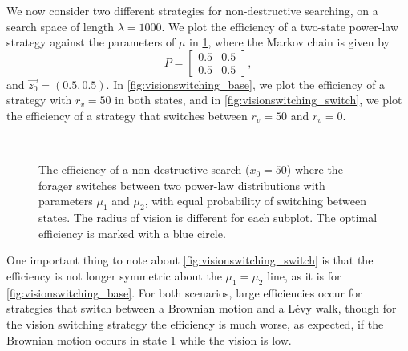 We now consider two different strategies for non-destructive searching, on a search space of length $\lambda=1000$. We plot the efficiency of a two-state power-law strategy against the parameters of $\mu$ in \cref{fig:visionswitching}, where the Markov chain is given by
\begin{equation*}
P = \begin{bmatrix}
0.5 & 0.5\\
0.5 & 0.5
\end{bmatrix},
\end{equation*} and $\vec{z_{0}} = (0.5,0.5)$. In \cref{fig:visionswitching_base}, we plot the efficiency of a strategy with $r_v=50$ in both states, and in \cref{fig:visionswitching_switch}, we plot the efficiency of a strategy that switches between $r_v=50$ and $r_v=0$.
\begin{figure}[h!]
	\centering
	\hfill
	\\
	\caption[Efficiency of two-state Markov-modulated power-law strategy, with switching radius of vision]{The efficiency of a non-destructive search ($x_0=50$) where the forager switches between two power-law distributions with parameters $\mu_1$ and $\mu_2$, with equal probability of switching between states. The radius of vision is different for each subplot. The optimal efficiency is marked with a blue circle.}\label{fig:visionswitching}
\end{figure}
One important thing to note about \cref{fig:visionswitching_switch} is that the efficiency is not longer symmetric about the $\mu_1=\mu_2$ line, as it is for \cref{fig:visionswitching_base}. For both scenarios, large efficiencies occur for strategies that switch between a Brownian motion and a L\'{e}vy walk, though for the vision switching strategy the efficiency is much worse, as expected, if the Brownian motion occurs in state $1$ while the vision is low. 
